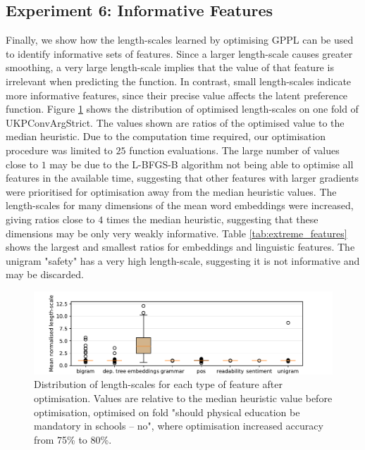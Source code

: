 \subsection{Experiment 6: Informative Features}

Finally, we show how the length-scales learned by optimising GPPL can be used to identify
informative sets of features. Since a larger length-scale causes greater smoothing, 
a very large length-scale implies that the value of that feature is irrelevant when predicting 
the function. In contrast, small length-scales indicate more informative features, since their
precise value affects the latent preference function.
Figure \ref{fig:boxplot} shows the distribution of optimised length-scales on one fold of UKPConvArgStrict. 
The values shown are ratios of the optimised value to the median heuristic. 
Due to the computation time required, our optimisation procedure was limited to $25$ function evaluations. 
The large number of values close to $1$ may be due to the L-BFGS-B
algorithm not being able to optimise all features in the available time, 
suggesting that other features with larger gradients were prioritised for optimisation
away from the median heuristic values. 
The length-scales for many dimensions of the mean word embeddings were increased,
giving ratios close to $4$ times the median heuristic, suggesting that these dimensions may be
only very weakly informative. Table \ref{tab:extreme_features} shows the largest
and smallest ratios for embeddings and linguistic features. The unigram "safety" has
a very high length-scale, suggesting it is not informative and may be discarded. 
\begin{figure}
\includegraphics[width=\columnwidth, clip=True, trim=32 0 57 0]{figures/features/boxplot}
\caption{Distribution of length-scales for each type of feature after optimisation. 
Values are relative to the median heuristic value before optimisation, optimised 
on fold "should physical education be mandatory in schools -- no", where 
optimisation increased accuracy from 75\% to 80\%. }
\label{fig:boxplot}
\end{figure}
